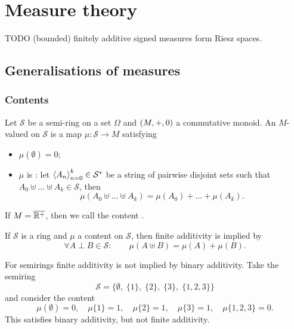 \chapter{Measure theory}
TODO (bounded) finitely additive signed measures form Riesz spaces.

\section{Generalisations of measures}
\subsection{Contents}
\begin{definition}
Let $\mathcal{S}$ be a semi-ring on a set $\Omega$ and $\left( M,+,0 \right)$ a commutative monoid. An $M$-valued  on $\mathcal{S}$ is a map $\mu: \mathcal{S} \to M$ satisfying
\begin{itemize}
\item $\mu(\emptyset) = 0$;
\item $\mu$ is : let $\left\langle A_n \right\rangle_{n=0}^k\in \mathcal{S}^*$ be a string of pairwise disjoint sets such that $A_0 \uplus \ldots \uplus A_{k} \in \mathcal{S}$, then
\[ \mu(A_0 \uplus \ldots \uplus A_{k}) = \mu(A_0) + \ldots + \mu(A_{k}). \]
\end{itemize}
If $M = \overline{\mathbb{R}^+}$, then we call the content .
\end{definition}

\begin{lemma}
If $\mathcal{S}$ is a ring and $\mu$ a content on $\mathcal{S}$, then finite  additivity is implied by
\[ \forall A\perp B\in \mathcal{S}:\qquad \mu(A\uplus B) = \mu(A) + \mu(B). \]
\end{lemma}

\begin{example}
For semirings finite  additivity is not implied by binary additivity. Take the semiring
\[ \mathcal{S} = \big\{\emptyset,\; \{1\},\; \{2\},\; \{3\},\; \{1,2,3\}\big\} \]
and consider the content
\[ \mu(\emptyset) = 0,\quad \mu\{1\} = 1, \quad \mu\{2\} = 1, \quad \mu\{3\} = 1, \quad \mu\{1,2,3\} = 0. \]
This satisfies binary additivity, but not finite additivity.
\end{example}

